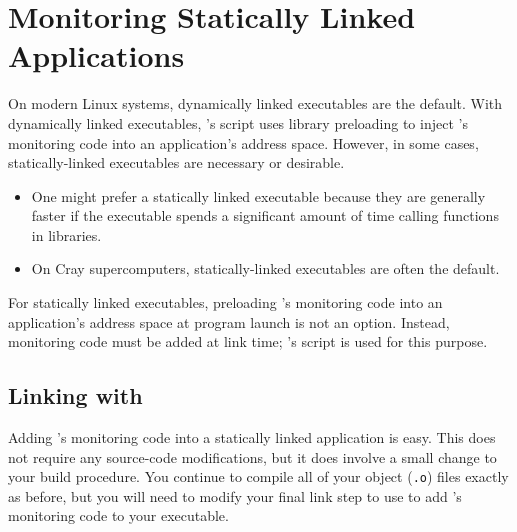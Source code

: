 \documentclass[11pt,letterpaper]{report}
\begin{document}

\chapter{Monitoring Statically Linked Applications}
\label{chpt:statically-linked-apps}



On modern Linux systems, dynamically linked executables are the default.
With dynamically linked executables, \HPCToolkit{}'s \hpcrun{} script uses library preloading to inject \HPCToolkit's monitoring code into an application's address space.
However, in some cases, statically-linked executables are necessary or desirable.
\begin{itemize}
\item One might prefer a statically linked executable because they are generally faster if the executable spends a significant amount of time calling functions in libraries.
\item On Cray supercomputers, statically-linked executables are often the default.
\end{itemize}

For statically linked executables, preloading \HPCToolkit's monitoring code into an application's address space at program launch is not an option.
Instead, monitoring code must be added at link time; \HPCToolkit{}'s \hpclink{} script is used for this purpose.


\section{Linking with \hpclink{}}

Adding \HPCToolkit{}'s monitoring code into a statically linked application is easy.
This does not require any source-code modifications, but it does involve a small change to your build procedure.
You continue to compile all of your object (\texttt{.o}) files exactly as before, but you will need to modify your final link step to use \hpclink{} to add \HPCToolkit{}'s monitoring code to your executable.
\end{document}
